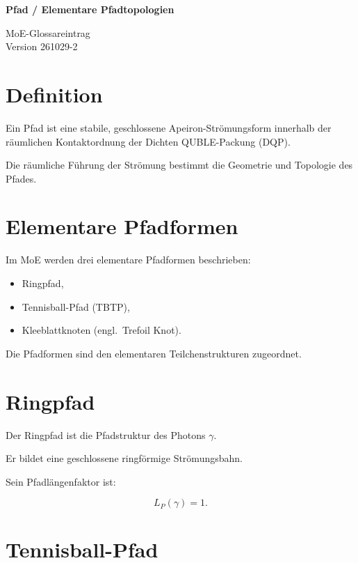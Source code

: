 \documentclass[11pt,a4paper]{article}
\begin{document}
\vspace*{-1.8cm}

\noindent
\begin{minipage}[t]{0.66\textwidth}
{\LARGE\bfseries Pfad /
Elementare Pfadtopologien}
\end{minipage}
\hfill
\begin{minipage}[t]{0.30\textwidth}
\raggedleft
{\small MoE-Glossareintrag}\\
{\small Version 261029-2}
\end{minipage}

\vspace{1.4em}

\section*{Definition}

Ein Pfad ist eine stabile,
geschlossene Apeiron-Strömungsform
innerhalb der räumlichen
Kontaktordnung der Dichten
QUBLE-Packung (DQP).

Die räumliche Führung der
Strömung bestimmt die Geometrie
und Topologie des Pfades.

\section*{Elementare Pfadformen}

Im MoE werden drei elementare
Pfadformen beschrieben:

\begin{itemize}
\item Ringpfad,
\item Tennisball-Pfad (TBTP),
\item Kleeblattknoten
      (engl.\ Trefoil Knot).
\end{itemize}

Die Pfadformen sind den
elementaren Teilchenstrukturen
zugeordnet.

\section*{Ringpfad}

Der Ringpfad ist die
Pfadstruktur des Photons
$\gamma$.

Er bildet eine geschlossene
ringförmige Strömungsbahn.

Sein Pfadlängenfaktor ist:

\[
L_P(\gamma)=1.
\]

\section*{Tennisball-Pfad}
\end{document}
